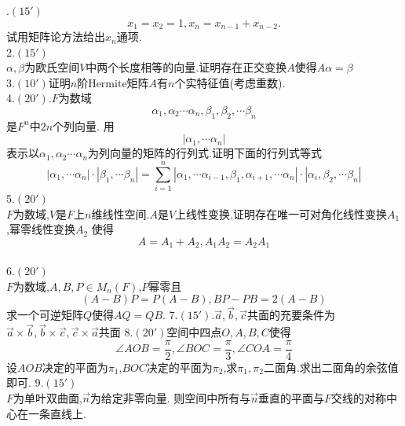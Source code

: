 \documentclass[b5paper]{ctexart}
\begin{document}
\pagestyle{plain}
.$(15')$
\[x_1=x_2=1,x_n=x_{n-1}+x_{n-2}.\]
试用矩阵论方法给出$x_n$通项.\\
2.$(15')$\\
$\alpha,\beta$为欧氏空间$V$中两个长度相等的向量.证明存在正交变换$A$使得$A\alpha=\beta$\\
3.$(10')$证明$n$阶$\mathrm{Hermite}$矩阵$A$有$n$个实特征值(考虑重数).\\
4.$(20')$.$F$为数域
\[\alpha_1,\alpha_2\cdots \alpha_n,\beta_1,\beta_2,\cdots \beta_n\]
是$F^n$中$2n$个列向量.
用\[\left|\alpha_1,\cdots \alpha_n\right|\]表示以$\alpha_1,\alpha_2\cdots \alpha_n$为列向量的矩阵的行列式.证明下面的行列式等式\\
\[\left|\alpha_1,\cdots \alpha_n\right|\cdot \left|\beta_1,\cdots \beta_n\right|=\sum_{i=1}^n \left|\alpha_1,\cdots \alpha_{i-1},\beta_1,\alpha_{i+1},\cdots \alpha_n\right|\cdot \left|\alpha_i, \beta_2,\cdots \beta_n\right|\]
5.$(20')$\\
$F$为数域,$V$是$F$上$n$维线性空间.$A$是$V$上线性变换.证明存在唯一可对角化线性变换$A_1$,幂零线性变换$A_2$
使得
\[A=A_1+A_2,A_1A_2=A_2A_1\]\\
6.$(20')$\\
$F$为数域,$A,B,P\in M_n(F)$,$P$幂零且\\
\[(A-B)P=P(A-B),BP-PB=2(A-B)\]
求一个可逆矩阵$Q$使得$AQ=QB$.
7.$(15')$.$\overrightarrow{a},\overrightarrow{b},\overrightarrow{c}$共面的充要条件为$\overrightarrow{a}\times \overrightarrow{b},
\overrightarrow{b}\times \overrightarrow{c},\overrightarrow{c}\times \overrightarrow{a}$共面
8.$(20')$空间中四点$O,A,B,C$使得
\[\angle AOB=\frac{\pi}{2},\angle BOC=\frac{\pi}{3},\angle COA=\frac{\pi}{4}\]
设$AOB$决定的平面为$\pi_1$,$BOC$决定的平面为$\pi_2$,求$\pi_1,\pi_2$二面角.求出二面角的余弦值即可.
9.$(15')$\\
$F$为单叶双曲面,$\overrightarrow{n}$为给定非零向量.
则空间中所有与$\overrightarrow{n}$垂直的平面与$F$交线的对称中心在一条直线上.
\end{document}
